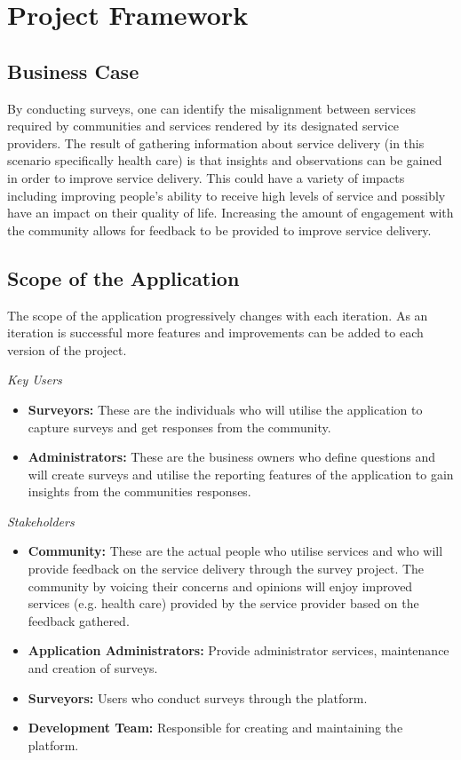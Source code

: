 \documentclass[12pt]{witseiepaper}
\begin{document}
\section{Project Framework} 

\subsection{Business Case} 
  
\noindent By conducting surveys, one can identify the misalignment between services required by communities and services rendered by its designated service providers. The result of gathering information about service delivery (in this scenario specifically health care) is that insights and observations can be gained in order to improve service delivery. This could have a variety of impacts including improving people's ability to receive high levels of service and possibly have an impact on their quality of life. Increasing the amount of engagement with the community allows for feedback to be provided to improve service delivery.

\subsection{Scope of the Application}
The scope of the application progressively changes with each iteration. As an iteration is successful more features and improvements can be added to each version of the project.

\emph{Key Users} 
\begin{itemize}
  \item \textbf{Surveyors:} These are the individuals who will utilise the application to capture surveys and get responses from the community.
  \item \textbf{Administrators:} These are the business owners who define questions and will create surveys and utilise the reporting features of the application to gain insights from the communities responses.
\end{itemize}

\emph{Stakeholders} 
\begin{itemize}
  \item \textbf{Community:} These are the actual people who utilise services and who will provide feedback on the service delivery through the survey project. The community by voicing their concerns and opinions will enjoy improved services (e.g. health care) provided by the service provider based on the feedback gathered.
  \item \textbf{Application Administrators:} Provide administrator services, maintenance and creation of surveys.
  \item \textbf{Surveyors:} Users who conduct surveys through the platform.
  \item \textbf{Development Team:} Responsible for creating and maintaining the platform. 
\end{itemize}
\end{document}
